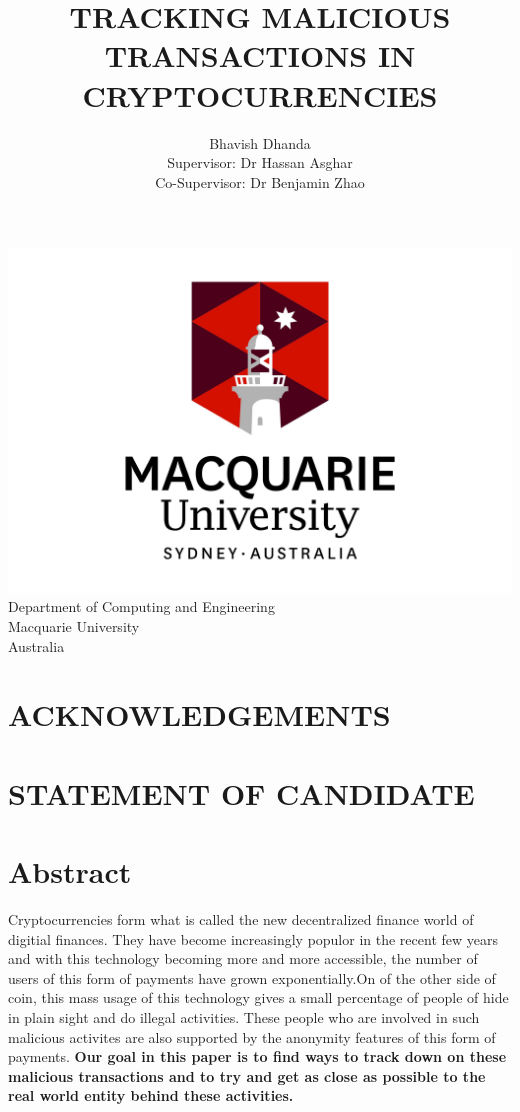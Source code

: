 \documentclass{article}
\begin{document}
\begin{titlepage}
\title{TRACKING MALICIOUS TRANSACTIONS IN CRYPTOCURRENCIES}
\author{Bhavish Dhanda {\\ Supervisor: Dr Hassan Asghar} {\\ Co-Supervisor: Dr Benjamin Zhao}}
\date{}
\end{titlepage}
\maketitle
\begin{center}
    \includegraphics[width=0.7\linewidth]{logo.jpg}\\[4ex]
    Department of Computing and Engineering\\
    Macquarie University\\
    Australia
\end{center}
\pagebreak
\tableofcontents
\pagebreak
\listoffigures
\lstlistoflistings
\pagebreak

\section*{ACKNOWLEDGEMENTS}
\pagebreak
\section*{STATEMENT OF CANDIDATE}
\pagebreak
\section{Abstract}
Cryptocurrencies form what is called the new decentralized finance world of digitial finances. They have become increasingly populor in the recent few years and with this technology becoming more and more accessible, the number of users of this form of payments have grown exponentially.On of the other side of coin, this mass usage of this technology gives a small percentage of people of hide in plain sight and do illegal activities. These people who are involved in such malicious activites are also supported by the anonymity features of this form of payments. \textbf{Our goal in this paper is to find ways to track down on these malicious transactions and to try and get as close as possible to the real world entity behind these activities.}
\pagebreak
\end{document}
